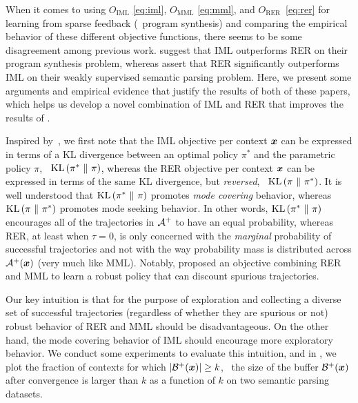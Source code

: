 When it comes to using $\displaystyle O_{\mathrm{IML}}$
\eqref{eq:iml}, $\displaystyle O_{\mathrm{MML}}$ \eqref{eq:mml}, and
$\displaystyle O_{\mathrm{RER}}$~\eqref{eq:rer} for learning from
sparse feedback (\eg~program synthesis) and comparing the empirical
behavior of these different objective functions, there seems to be
some disagreement among previous work. \citet{pqt2018} suggest that
IML outperforms RER on their program synthesis problem, whereas
\citet{liang2017nsm} assert that RER significantly outperforms IML on
their weakly supervised semantic parsing problem.  Here, we present
some arguments and empirical evidence that justify the results of both
of these papers, which helps us develop a novel combination of IML and
RER that improves the results of \cite{liang2017nsm}.

Inspired by~\cite{norouzi2016reward,nachum2016improving}, we first
note that the IML objective per context ${\bm{x}}$ can be expressed in
terms of a KL divergence between an optimal policy $\pi^*$ and the
parametric policy $\pi$, \ie~${\mathrm{KL}}\left(\pi^*~\Vert~\pi\right)$, whereas the RER
objective per context ${\bm{x}}$ can be expressed in terms of the same KL
divergence, but {\em reversed}, \ie~${\mathrm{KL}}\left(\pi~\Vert~\pi^*\right)$. It is well
understood that ${\mathrm{KL}}\left(\pi^*~\Vert~\pi\right)$ promotes {\em mode covering}
behavior, whereas ${\mathrm{KL}}\left(\pi~\Vert~\pi^*\right)$ promotes mode seeking behavior. In
other words, ${\mathrm{KL}}\left(\pi^*~\Vert~\pi\right)$ encourages all of the trajectories in
$\mathcal{A}^+$ to have an equal probability, whereas RER, at least when
$\tau = 0$, is only concerned with the {\em marginal} probability of
successful trajectories and not with the way probability mass is
distributed across $\mathcal{A}^+({\bm{x}})$ (very much like MML).
Notably, \citet{guu2017language} proposed an objective combining RER and MML
to learn a robust policy that can discount spurious trajectories.

Our key intuition is that for the purpose of exploration and
collecting a diverse set of successful trajectories (regardless of
whether they are spurious or not) robust behavior of RER and MML
should be disadvantageous. On the other hand, the mode covering
behavior of IML should encourage more exploratory behavior. We conduct
some experiments to evaluate this intuition, and
in , we plot the fraction of contexts for
which $\lvert \mathcal{B}^+({\bm{x}}) \rvert \ge k$, \ie~the size of the buffer
$\mathcal{B}^+({\bm{x}})$ after convergence is larger than $k$ as a function of
$k$ on two semantic parsing datasets.

